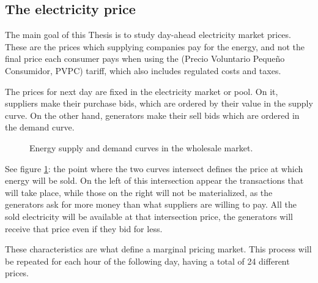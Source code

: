 \subsection{The electricity price}
The main goal of this Thesis is to study day-ahead electricity market prices.
These are the prices which supplying companies pay for the energy, and not the final price each consumer pays when using the (Precio Voluntario Pequeño Consumidor, PVPC) tariff, which also includes regulated costs and taxes. \cite{mercado-electrico-xataka}

The prices for next day are fixed in the electricity market or pool.
On it, suppliers make their purchase bids, which are ordered by their value in the supply curve.
On the other hand, generators make their sell bids which are ordered in the demand curve.

\begin{figure}[H]
\centering
    \caption{Energy supply and demand curves in the wholesale market. \cite{curva-oferta-demanda}}
    \label{fig:supply-demand-curves}
\end{figure}

See figure \ref{fig:supply-demand-curves}: the point where the two curves intersect defines the price at which energy will be sold. On the left of this intersection appear the transactions that will take place, while those on the right will not be materialized, as the generators ask for more money than what suppliers are willing to pay.
All the sold electricity will be available at that intersection price, the generators will receive that price even if they bid for less.

These characteristics are what define a marginal pricing market.
This process will be repeated for each hour of the following day, having a total of 24 different prices.

